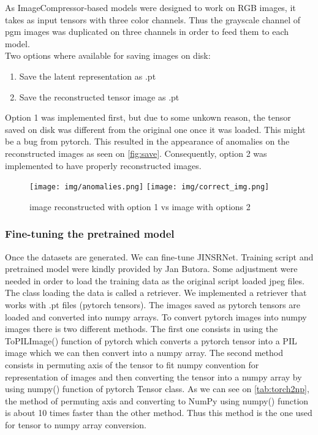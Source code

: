 \documentclass[12pt]{article}
\begin{document}
As ImageCompressor-based models were designed to work on RGB images, it takes as input tensors with three color channels. Thus the grayscale channel of pgm images was duplicated on three channels in order to feed them to each model.\\
Two options where available for saving images on disk:
\begin{enumerate}
    \item Save the latent representation as .pt
    \item Save the reconstructed tensor image as .pt
\end{enumerate}
Option 1 was implemented first, but due to some unkown reason, the tensor saved on disk was different from the original one once it was loaded. This might be a bug from pytorch. This resulted in the appearance of anomalies on the reconstructed images as seen on \autoref{fig:save}. Consequently, option 2 was implemented to have properly reconstructed images.
\begin{figure}[h]
    \texttt{[image: img/anomalies.png]}
    \texttt{[image: img/correct\_img.png]}
    \caption[Image reconstructed from tensor saved on disk]{image reconstructed with option 1 vs image with options 2}
    \label{fig:save}
\end{figure}

\subsubsection{Fine-tuning the pretrained model}
Once the datasets are generated. We can fine-tune JINSRNet.
Training script and pretrained model were kindly provided by Jan Butora. Some adjustment were needed in order to load the training data as the original script loaded jpeg files. The class loading the data is called a retriever. We implemented a retriever that works with .pt files (pytorch tensors). The images saved as pytorch tensors are loaded and converted into numpy arrays. To convert pytorch images into numpy images there is two different methods. The first one consists in using the ToPILImage() function of pytorch which converts a pytorch tensor into a PIL image which we can then convert into a numpy array. The second method consists in permuting axis of the tensor to fit numpy convention for representation of images and then converting the tensor into a numpy array by using numpy() function of pytorch Tensor class. As we can see on \autoref{tab:torch2np}, the method of permuting axis and converting to NumPy using numpy() function is about 10 times faster than the other method. Thus this method is the one used for tensor to numpy array conversion.\\
\end{document}
